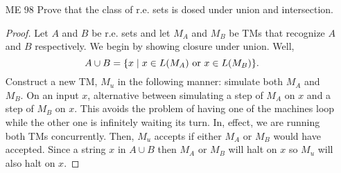 \documentclass{article}
\newcommand{\setst}{\hspace{1mm} | \hspace{1mm} }
\theoremstyle{definition}
\begin{document}
\begin{enumerate}
\begin{proof}
		Conversely, assume that $E$ enumerates a set $A$ in increasing order. We will simulate $E$ with a three tape TM $M$ where $E$ is simulated on the bottom two tapes and the input is on the first tape. We begin simulating $E$ and every time $E$ enumerates a string, we check two conditions. If the input $x$ is equal to the enumerated string $e$, then, the $M$ accepts $x$ and halts. If $e$ is greater than $x$, then we have already passed the place where $x$ would be enumerated so it cannot be in $L(E)$. Since the order is computable Thus, $M$ rejects on $x$ and halts. Otherwise, continue simulating $E$.
	\end{proof}
	\item[ME 98] Prove that the class of r.e. sets is dosed under union and intersection.
	\begin{proof}
		Let $A$ and $B$ be r.e. sets and let $M_A$ and $M_B$ be TMs that recognize $A$ and $B$ respectively. We begin by showing closure under union. Well,
		\[A \cup B = \{x \setst x \in L(M_A) \text{ or } x \in L(M_B)\}.\]
		Construct a new TM, $M_u$ in the following manner: simulate both $M_A$ and $M_B$. On an input $x$, alternative between simulating a step of $M_A$ on $x$ and a step of $M_B$ on $x$. This avoids the problem of having one of the machines loop while the other one is infinitely waiting its turn. In, effect, we are running both TMs concurrently. Then, $M_u$ accepts if either $M_A$ or $M_B$ would have accepted. Since a string $x$ in $A \cup B$ then $M_A$ or $M_B$ will halt on $x$ so $M_u$ will also halt on $x$.
		

\end{proof}
\end{enumerate}
\end{document}
